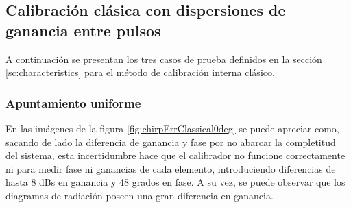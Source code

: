 \subsection{Calibración clásica con dispersiones de ganancia entre pulsos}

A continuación se presentan los tres casos de prueba definidos en la sección \ref{sc:characteristics} para el método de
calibración interna clásico.


\subsubsection{Apuntamiento uniforme}

En las imágenes de la figura \ref{fig:chirpErrClassical0deg} se puede apreciar como, sacando de lado la diferencia de 
ganancia y fase por no abarcar la completitud del sistema, esta incertidumbre hace que el calibrador no funcione correctamente 
ni para medir fase ni ganancias de cada elemento, introduciendo diferencias de hasta 8 dBs en ganancia y 48 grados en fase.
A su vez, se puede observar que los diagramas de radiación poseen una gran diferencia en ganancia.

